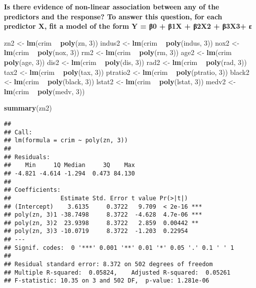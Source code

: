 \documentclass[]{article}
\newenvironment{Shaded}{\begin{snugshade}}{\end{snugshade}}
\newcommand{\KeywordTok}[1]{\textcolor[rgb]{0.13,0.29,0.53}{\textbf{#1}}}
\newcommand{\DecValTok}[1]{\textcolor[rgb]{0.00,0.00,0.81}{#1}}
\newcommand{\StringTok}[1]{\textcolor[rgb]{0.31,0.60,0.02}{#1}}
\newcommand{\OperatorTok}[1]{\textcolor[rgb]{0.81,0.36,0.00}{\textbf{#1}}}
\newcommand{\NormalTok}[1]{#1}
\begin{document}
\textbf{Is there evidence of non-linear association between any of the
predictors and the response? To answer this question, for each predictor
X, fit a model of the form Y = β0 + β1X + β2X2 + β3X3+ ε}

\begin{Shaded}
\begin{Highlighting}[]
\NormalTok{zn2 <-}\StringTok{ }\KeywordTok{lm}\NormalTok{(crim }\OperatorTok{~}\StringTok{ }\KeywordTok{poly}\NormalTok{(zn, }\DecValTok{3}\NormalTok{))}
\NormalTok{indus2 <-}\StringTok{ }\KeywordTok{lm}\NormalTok{(crim }\OperatorTok{~}\StringTok{ }\KeywordTok{poly}\NormalTok{(indus, }\DecValTok{3}\NormalTok{))}
\NormalTok{nox2 <-}\StringTok{ }\KeywordTok{lm}\NormalTok{(crim }\OperatorTok{~}\StringTok{ }\KeywordTok{poly}\NormalTok{(nox, }\DecValTok{3}\NormalTok{))}
\NormalTok{rm2 <-}\StringTok{ }\KeywordTok{lm}\NormalTok{(crim }\OperatorTok{~}\StringTok{ }\KeywordTok{poly}\NormalTok{(rm, }\DecValTok{3}\NormalTok{))}
\NormalTok{age2 <-}\StringTok{ }\KeywordTok{lm}\NormalTok{(crim }\OperatorTok{~}\StringTok{ }\KeywordTok{poly}\NormalTok{(age, }\DecValTok{3}\NormalTok{))}
\NormalTok{dis2 <-}\StringTok{ }\KeywordTok{lm}\NormalTok{(crim }\OperatorTok{~}\StringTok{ }\KeywordTok{poly}\NormalTok{(dis, }\DecValTok{3}\NormalTok{))}
\NormalTok{rad2 <-}\StringTok{ }\KeywordTok{lm}\NormalTok{(crim }\OperatorTok{~}\StringTok{ }\KeywordTok{poly}\NormalTok{(rad, }\DecValTok{3}\NormalTok{))}
\NormalTok{tax2 <-}\StringTok{ }\KeywordTok{lm}\NormalTok{(crim }\OperatorTok{~}\StringTok{ }\KeywordTok{poly}\NormalTok{(tax, }\DecValTok{3}\NormalTok{))}
\NormalTok{ptratio2 <-}\StringTok{ }\KeywordTok{lm}\NormalTok{(crim }\OperatorTok{~}\StringTok{ }\KeywordTok{poly}\NormalTok{(ptratio, }\DecValTok{3}\NormalTok{))}
\NormalTok{black2 <-}\StringTok{ }\KeywordTok{lm}\NormalTok{(crim }\OperatorTok{~}\StringTok{ }\KeywordTok{poly}\NormalTok{(black, }\DecValTok{3}\NormalTok{))}
\NormalTok{lstat2 <-}\StringTok{ }\KeywordTok{lm}\NormalTok{(crim }\OperatorTok{~}\StringTok{ }\KeywordTok{poly}\NormalTok{(lstat, }\DecValTok{3}\NormalTok{))}
\NormalTok{medv2 <-}\StringTok{ }\KeywordTok{lm}\NormalTok{(crim }\OperatorTok{~}\StringTok{ }\KeywordTok{poly}\NormalTok{(medv, }\DecValTok{3}\NormalTok{))}

\KeywordTok{summary}\NormalTok{(zn2)}
\end{Highlighting}
\end{Shaded}

\begin{verbatim}
## 
## Call:
## lm(formula = crim ~ poly(zn, 3))
## 
## Residuals:
##    Min     1Q Median     3Q    Max 
## -4.821 -4.614 -1.294  0.473 84.130 
## 
## Coefficients:
##              Estimate Std. Error t value Pr(>|t|)    
## (Intercept)    3.6135     0.3722   9.709  < 2e-16 ***
## poly(zn, 3)1 -38.7498     8.3722  -4.628  4.7e-06 ***
## poly(zn, 3)2  23.9398     8.3722   2.859  0.00442 ** 
## poly(zn, 3)3 -10.0719     8.3722  -1.203  0.22954    
## ---
## Signif. codes:  0 '***' 0.001 '**' 0.01 '*' 0.05 '.' 0.1 ' ' 1
## 
## Residual standard error: 8.372 on 502 degrees of freedom
## Multiple R-squared:  0.05824,    Adjusted R-squared:  0.05261 
## F-statistic: 10.35 on 3 and 502 DF,  p-value: 1.281e-06
\end{verbatim}
\end{document}
